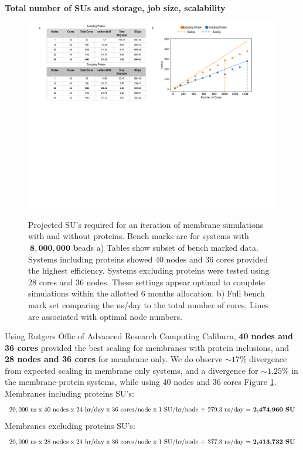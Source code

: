 \documentclass[oneside]{report}
\begin{document}
{\bf Total number of SUs and storage, job size, scalability}
\begin{figure}[h]
\includegraphics [scale=.5]{SU_Bench.pdf}
\label{fig:SU}
\caption{Projected SU's required for an iteration of membrane simulations with and without proteins. Bench marks are for systems with $\pmb{\> 8,000,000}$ \textbf beads a) Tables show subset of bench marked data. Systems including proteins showed 40 nodes and 36 cores provided the highest efficiency. Systems excluding proteins were tested using 28 cores and 36 nodes. These settings appear optimal to complete simulations within the allotted 6 months allocation. b) Full bench mark set comparing the ns/day to the total number of cores. Lines are associated with optimal node numbers.}
\end{figure}

Using Rutgers Offic of Advanced Research Computing Caliburn, \textbf{40 nodes and 36 cores} provided the best scaling for membranes with protein inclusions, and \textbf{28 nodes and 36 cores} for membrane only. We do observe $\sim 17\%$ divergence from expected scaling in membrane only systems, and a divergence for $\sim 1.25\%$ in the membrane-protein systems, while using 40 nodes and 36 cores Figure \ref{fig:SU}. \\

Membranes including proteins SU's:
\[20,000\textrm{ ns x }40\textrm{ nodes x }24\textrm{ hr/day x } 36 \textrm{ cores/node x } 1 \textrm{ SU/hr/node $ \div$ }279.3 \textrm{ ns/day = } \textbf{2,474,960 \textrm{SU}} \]
Membranes excluding proteins SU's:
\[ 20,000\textrm{ ns x }28\textrm{ nodes x }24\textrm{ hr/day x } 36 \textrm{ cores/node x } 1 \textrm{ SU/hr/node $ \div$ }377.3\textrm{ ns/day = } \textbf{2,413,732 \textrm{SU}} \]
\end{document}
